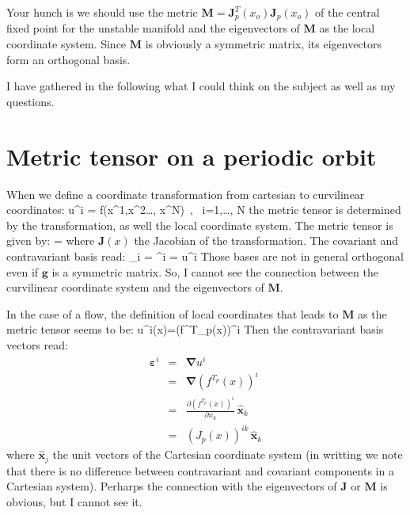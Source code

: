 \documentclass[article,preprint]{revtex4}
\begin{document}
 Your hunch is we should use the metric $\mathbf{M}=\mathbf{J}_p^T(x_o)
 \mathbf{J}_p(x_o)$ of the central fixed point for the
 unstable manifold and the eigenvectors of $\mathbf{M}$ as the local
 coordinate system. Since $\mathbf{M}$ is obviously a symmetric
 matrix, its eigenvectors form an orthogonal basis.

 I have gathered in the following what I could think on the subject as well as my questions.  

\section{Metric tensor on a periodic orbit}
 
 When we define a coordinate transformation from cartesian to curvilinear
 coordinates:
 \beq
   u^i = f(x^1,x^2\ldots, x^N)\, , \  i=1,\ldots , N
 \eeq
 the metric tensor is determined by the transformation,
 as well the local coordinate system. The metric tensor is given by:
 \beq
  =
 \eeq
 where $\mathbf{J}(x)$ the Jacobian of the transformation. The
 covariant and contravariant basis read:
 \beq
  \mathbf{\varepsilon}_i = 
 \eeq
 \beq
  \mathbf{\varepsilon}^i =  \mathbf{\nabla} u^i
 \eeq
 Those bases are not in general orthogonal even if $\mathbf{g}$ is a
 symmetric matrix. So, I cannot see the connection between the
 curvilinear coordinate system and the eigenvectors of $\mathbf{M}$. 


 In the case of a flow, the definition of local coordinates that leads
 to $\mathbf{M}$ as the metric tensor seems to be:
 \beq
  u^i(x)=\left(f^{T_p}(x)\right)^i
 \eeq
 Then the contravariant basis vectors read:
 \begin{eqnarray}
  \mathbf{\varepsilon}^i & = & \mathbf{\nabla} u^i \nonumber \\
                         & = & \mathbf{\nabla} \left(f^{T_p}(x)\right)^i
                         \nonumber \\
                         & = & \frac{\partial
                           \left(f^{T_p}(x)\right)^i}{\partial x_k}\,
                         \hat{\mathbf{x}}_k \nonumber \\
                         & = & \left(J_p(x)\right)^{ik}\,
                         \hat{\mathbf{x}}_k 
 \label{eq:contravariant basis}
 \end{eqnarray}
 where $\hat{\mathbf{x}}_j$ the unit vectors of the Cartesian
 coordinate system (in writting  we note 
 that there is no difference between contravariant and 
 covariant components in a Cartesian system). Perharps the connection
 with the eigenvectors of $\mathbf{J}$ or $\mathbf{M}$ is obvious, but
 I cannot see it.
\end{document}
